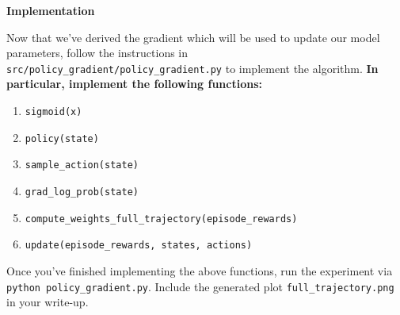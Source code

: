 \item {} 
\textbf{Implementation}

Now that we've derived the gradient which will be used to update our model parameters, follow the instructions in {\tt src/policy\_gradient/policy\_gradient.py} to implement the algorithm. \textbf{In particular, implement the following functions:}

\begin{enumerate}
    \item \texttt{sigmoid(x)}
    \item \texttt{policy(state)}
    \item \texttt{sample\_action(state)}
    \item \texttt{grad\_log\_prob(state)}
    \item \texttt{compute\_weights\_full\_trajectory(episode\_rewards)}
    \item \texttt{update(episode\_rewards, states, actions)}
\end{enumerate}

Once you've finished implementing the above functions, run the experiment via {\tt python policy\_gradient.py}. Include the generated plot \texttt{full\_trajectory.png} in your write-up.
